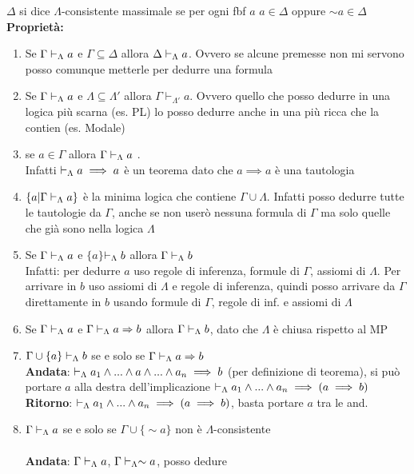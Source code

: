 $\Delta$ si dice $\Lambda$-consistente massimale se per ogni fbf
$a$ $a\in\Delta$ oppure $\sim a\in\Delta$ $ $\\




\textbf{Proprietà:}
\begin{enumerate}
\item Se $\teoa$ e $\Gamma\subseteq\Delta$ allora $\Delta\teorema a$.
Ovvero se alcune premesse non mi servono posso comunque metterle per
dedurre una formula
\item Se $\teorGamma a$ e $\Lambda\subseteq\Lambda'$ allora $\Gamma\vdash_{\Lambda'}a$.
Ovvero quello che posso dedurre in una logica più scarna (es. PL)
lo posso dedurre anche in una più ricca che la contien (es. Modale)
\item se $a\in\Gamma$ allora $\teoa$ . \\
Infatti $\teorema{a\implies a}$ è un teorema dato che $a\implies a$
è una tautologia
\item $\{a|\teoa\}$ è la minima logica che contiene $\Gamma\cup\Lambda$.
Infatti posso dedurre tutte le tautologie da $\Gamma$, anche se non
userò nessuna formula di $\Gamma$ ma solo quelle che già sono nella
logica $\Lambda$
\item Se $\teoa$ e $\{a\}$$\teorema b$ allora $\teorGamma b$ \\
Infatti: per dedurre $a$ uso regole di inferenza, formule di $\Gamma$,
assiomi di $\Lambda$. Per arrivare in $b$ uso assiomi di $\Lambda$
e regole di inferenza, quindi posso arrivare da $\Gamma$ direttamente
in $b$ usando formule di $\Gamma$, regole di inf. e assiomi di $\Lambda$
\item Se $\teoa$ e $\teorGamma{\implica ab}$ allora $\teorGamma b$, dato
che $\Lambda$ è chiusa rispetto al MP
\item $\Gamma\cup\{a\}\teorema b$ se e solo se $\teorGamma{\implica ab}$
\\
\textbf{Andata}: $\teorema{a_{1}\wedge...\wedge a\wedge...\wedge}a_{n}\implies b$
(per definizione di teorema), si può portare $a$ alla destra dell'implicazione
$\teorema{a_{1}\wedge...\wedge}a_{n}\implies(a\implies b)$ \\
\textbf{Ritorno}: $\teorema{a_{1}\wedge}...\wedge a_{n}\implies(a\implies b)$,
basta portare $a$ tra le $ $and.
\item $\teoa$ se e solo se $\Gamma\cup\{\sim a\}$ non è $\Lambda$-consistente
\\
\\
\textbf{Andata}: $\teoa$, $\Gamma\teorema{\sim a}$, posso dedure
$$
\end{enumerate}
